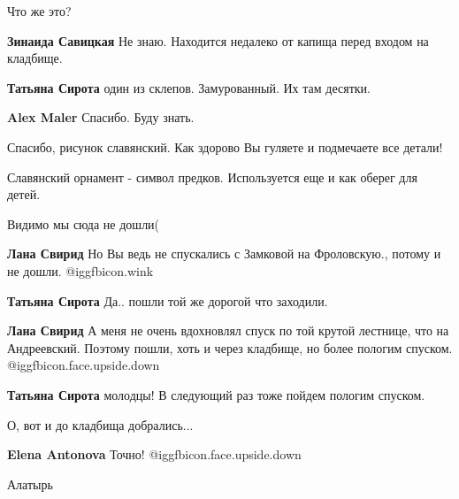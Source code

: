  
 
 
 
 


Что же это?

\textbf{Зинаида Савицкая} Не знаю. Находится недалеко от капища перед входом на кладбище.

\textbf{Татьяна Сирота} один из склепов. Замурованный. Их там десятки.

\textbf{Alex Maler} Спасибо. Буду знать.

Спасибо, рисунок славянский. Как здорово Вы гуляете и подмечаете все детали!

Славянский орнамент - символ предков. Используется еще и как оберег для детей.

Видимо мы сюда не дошли(

\textbf{Лана Свирид} Но Вы ведь не спускались с Замковой на Фроловскую., потому и не дошли. @igg{fbicon.wink} 

\textbf{Татьяна Сирота} Да.. пошли той же дорогой что заходили.

\textbf{Лана Свирид} А меня не очень вдохновлял спуск по той крутой лестнице, что на Андреевский. Поэтому пошли, хоть и через кладбище, но более пологим спуском. @igg{fbicon.face.upside.down} 

\textbf{Татьяна Сирота} молодцы! В следующий раз тоже пойдем пологим спуском.

О, вот и до кладбища добрались...

\textbf{Elena Antonova} Точно! @igg{fbicon.face.upside.down} 

Алатырь
